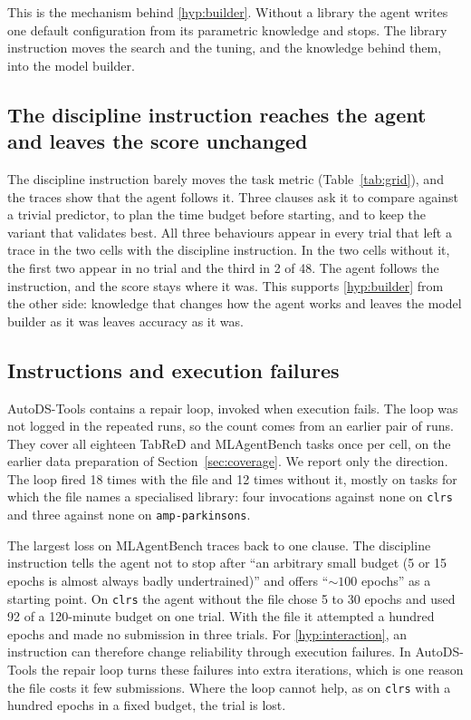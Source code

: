 This is the mechanism behind \ref{hyp:builder}. Without a library the agent
writes one default configuration from its parametric knowledge and stops.
The library instruction moves the search and the tuning, and the knowledge
behind them, into the model builder.


\subsection{The discipline instruction reaches the agent and leaves the score unchanged}
\label{sec:discipline}

The discipline instruction barely moves the task metric
(Table~\ref{tab:grid}), and the traces show that the agent follows it. Three clauses ask it to compare against a trivial predictor, to plan the
time budget before starting, and to keep the variant that validates best.
All three behaviours appear in every trial that left a trace in the two
cells with the discipline instruction. In the two cells without it, the
first two appear in no trial and the third in 2 of 48. The agent follows the
instruction, and the score stays where it was. This supports
\ref{hyp:builder} from the other side: knowledge that changes how the agent
works and leaves the model builder as it was leaves accuracy as it was.

\subsection{Instructions and execution failures}
\label{sec:friction}

AutoDS-Tools contains a repair loop, invoked when execution fails. The loop
was not logged in the repeated runs, so the count comes from an earlier pair
of runs. They cover all eighteen TabReD and MLAgentBench tasks once per
cell, on the earlier data preparation of Section~\ref{sec:coverage}. We
report only the direction. The loop fired 18 times with the file and 12 times without
it, mostly on tasks for which the file names a specialised library: four
invocations against none on \texttt{clrs} and three against none on
\texttt{amp-parkinsons}.

The largest loss on MLAgentBench traces back to one clause. The discipline
instruction tells the agent not to stop after ``an arbitrary small budget (5
or 15 epochs is almost always badly undertrained)'' and offers
``$\sim 100$ epochs'' as a starting point. On \texttt{clrs} the agent
without the file chose 5 to 30 epochs and used 92 of a 120-minute budget on
one trial. With the file it attempted a hundred epochs and made no
submission in three trials. For \ref{hyp:interaction}, an instruction can
therefore change reliability through execution failures. In AutoDS-Tools the
repair loop turns these failures into extra iterations, which is one reason
the file costs it few submissions. Where the loop cannot help, as on
\texttt{clrs} with a hundred epochs in a fixed budget, the trial is lost.

